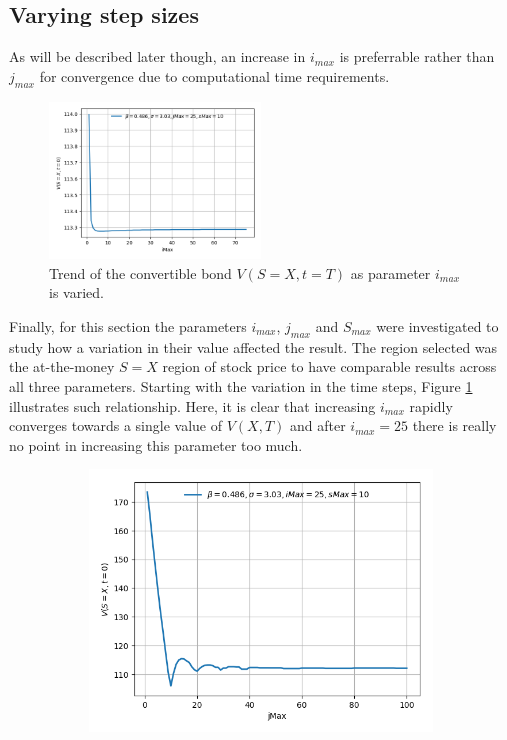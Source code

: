 \documentclass{article}
\begin{document}
\subsection{Varying step sizes}
As will be described later though, an increase in $i_{max}$ is preferrable rather than $j_{max}$ for convergence due to computational time requirements.
\begin{figure}[!h]
\includegraphics[width=0.5\textwidth,center]{../images/european_varying_imax.png}
\caption{Trend of the convertible bond $V(S=X,t=T)$ as parameter $i_{max}$ is varied.}
\label{fig:varying_imax}
\end{figure}
Finally, for this section the parameters $i_{max}$, $j_{max}$ and $S_{max}$ were investigated to study how a variation in their value affected the result.
The region selected was the at-the-money $S=X$ region of stock price to have comparable results across all three parameters.
Starting with the variation in the time steps, Figure \ref{fig:varying_imax} illustrates such relationship.
Here, it is clear that increasing $i_{max}$ rapidly converges towards a single value of $V(X,T)$ and after $i_{max}=25$ there is really no point in increasing this parameter too much.
\begin{figure}[!b]
\centering
\begin{minipage}{.55\textwidth}
  \centering
  \begin{subfigure}{\textwidth}
      \includegraphics[width=\linewidth]{../images/smax_jmax/10_european_varying_jmax.png}
  \label{fig:varying_jmax_10}
  \end{subfigure}
\end{minipage}
\end{figure}
\end{document}
